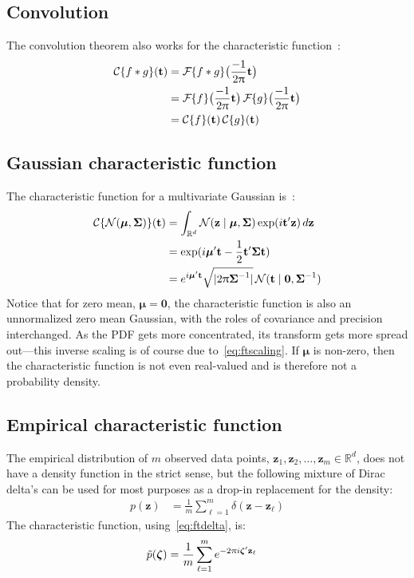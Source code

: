 \documentclass[a4paper,oneside,12pt,english]{report}
\def\zvec{\mathbf{z}}
\def\ND{\mathcal{N}}
\def\R{\mathbb{R}}
\def\detm#1{\lvert#1\rvert}
\def\muvec{\boldsymbol{\mu}}
\def\nulvec{\boldsymbol{0}}
\def\Fset{\mathcal{F}}
\def\Cset{\mathcal{C}}
\newcommand\FT[2][]{\Fset_{#1}\{#2\}}
\newcommand\CT[2][]{\Cset_{#1}\{#2\}}
\begin{document}
\subsection{Convolution}
\label{sec:cfConvolution}
The convolution theorem also works for the characteristic function~\cite{Oberhettinger}:
\begin{align}
\begin{split}
\CT{f\ast g}(\tvec) &= \FT{f\ast g}\bigl(\frac{-1}{2\uppi}\tvec\bigr) \\
&= \FT{f}\bigl(\frac{-1}{2\uppi}\tvec\bigr)\,\FT{g}\bigl(\frac{-1}{2\uppi}\tvec\bigr)\\
&= \CT{f}(\tvec)\,\CT{g}(\tvec) 
\end{split}
\end{align}

\subsection{Gaussian characteristic function}
\label{sec:GCF}
\def\Sigmamat{\boldsymbol{\Sigma}}
The characteristic function for a multivariate Gaussian is~\cite{Oberhettinger}:
\begin{align}
\begin{split}
\CT{\ND(\muvec,\Sigmamat)}(\tvec) &= \int_{\R^d} \ND(\zvec\mid \muvec,\Sigmamat) \exp(i\tvec'\zvec) \,d\zvec \\
&= \exp(i\muvec'\tvec-\frac12\tvec'\Sigmamat\tvec) \\
&= e^{i\muvec'\tvec} \sqrt{\detm{2\uppi\Sigmamat^{-1}}}\,\ND(\tvec\mid\nulvec,\Sigmamat^{-1}) 
\end{split}
\end{align}
Notice that for zero mean, $\muvec=\nulvec$, the characteristic function is also an unnormalized zero mean Gaussian, with the roles of covariance and precision interchanged. As the PDF gets more concentrated, its transform gets more spread out---this inverse scaling is of course due to~\eqref{eq:ftscaling}. If $\muvec$ is non-zero, then the characteristic function is not even real-valued and is therefore not a probability density.


\subsection{Empirical characteristic function}
The empirical distribution of $m$ observed data points, $\zvec_1,\zvec_2,\ldots,\zvec_m\in\R^d$, does not have a density function in the strict sense, but the following mixture of Dirac delta's can be used for most purposes as a drop-in replacement for the density:
\begin{align}
p(\zvec) &= \frac1m\sum_{\ell=1}^m \delta(\zvec-\zvec_\ell)
\end{align}
The characteristic function, using~\eqref{eq:ftdelta}, is:
\begin{align}
\label{eq:empc}
\tilde p(\zetavec) &= \frac1m\sum_{\ell=1}^m e^{-2\uppi i\zetavec'\zvec_\ell}
\end{align}
\end{document}
